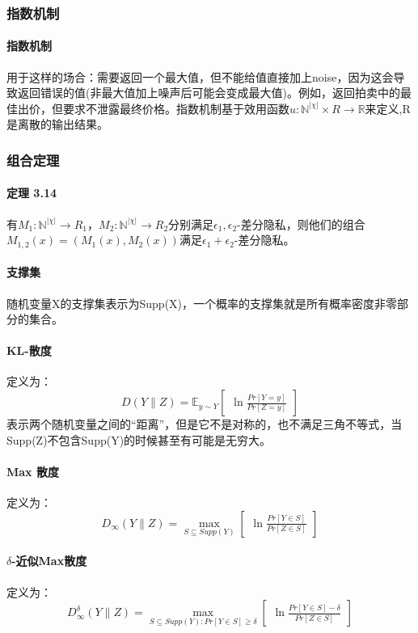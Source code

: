 \documentclass[12pt,a4paper]{article}
\begin{document}
\subsubsection{指数机制}
\paragraph{指数机制} 用于这样的场合：需要返回一个最大值，但不能给值直接加上noise，因为这会导致返回错误的值(非最大值加上噪声后可能会变成最大值)。例如，返回拍卖中的最佳出价，但要求不泄露最终价格。指数机制基于效用函数$u: \mathbb{N}^{|\chi|} \times R \rightarrow \mathbb{R}$来定义,R是离散的输出结果。
\subsubsection{组合定理}
\paragraph{定理 3.14} 有$M_1: \mathbb{N}^{|\chi|} \rightarrow R_1$，$M_2: \mathbb{N}^{|\chi|} \rightarrow R_2$分别满足$\epsilon_1, \epsilon_2$-差分隐私，则他们的组合$M_{1,2}(x)=(M_1(x),M_2(x))$满足$\epsilon_1+\epsilon_2$-差分隐私。
\paragraph{支撑集} 随机变量X的支撑集表示为Supp(X)，一个概率的支撑集就是所有概率密度非零部分的集合。
\paragraph{KL-散度} 定义为：
\begin{equation}
	D(Y \parallel Z) = \mathbb{E}_{y\sim Y}\begin{bmatrix} \ln \frac{Pr[Y = y]}{Pr[Z = y]} \end{bmatrix}
\end{equation}
表示两个随机变量之间的“距离”，但是它不是对称的，也不满足三角不等式，当Supp(Z)不包含Supp(Y)的时候甚至有可能是无穷大。
\paragraph{Max 散度} 定义为：
\begin{equation}
	D_{\infty}(Y \parallel Z) = \max_{S\subseteq Supp(Y)} \begin{bmatrix} \ln \frac{Pr[Y \in S]}{Pr[Z \in S]} \end{bmatrix}
\end{equation}
\paragraph{$\delta$-近似Max散度} 定义为：
\begin{equation}
	D_{\infty}^{\delta}(Y \parallel Z) = \max_{S\subseteq Supp(Y):Pr[Y \in S]\geq \delta} \begin{bmatrix} \ln \frac{Pr[Y \in S] - \delta}{Pr[Z \in S]} \end{bmatrix}
\end{equation}
\end{document}
